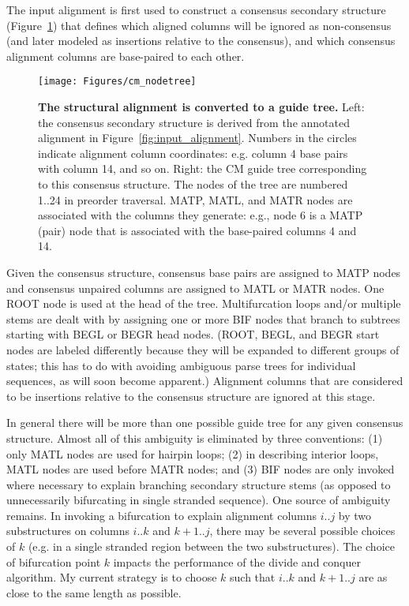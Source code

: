\documentclass[11pt]{article}
\begin{document}
The input alignment is first used to construct a consensus secondary
structure (Figure~\ref{fig:cm_nodetree}) that defines which aligned
columns will be ignored as non-consensus (and later modeled as
insertions relative to the consensus), and which consensus alignment
columns are base-paired to each other.

\begin{figure}[t]
\begin{center}
\texttt{[image: Figures/cm\_nodetree]}
\end{center}
\caption{\textbf{The structural alignment is converted to a guide
tree.} Left: the consensus secondary structure is derived from the
annotated alignment in Figure~\ref{fig:input_alignment}. Numbers in
the circles indicate alignment column coordinates: e.g.  column 4 base
pairs with column 14, and so on. Right: the CM guide tree
corresponding to this consensus structure. The nodes of the tree are
numbered 1..24 in preorder traversal. MATP, MATL, and MATR nodes are
associated with the columns they generate: e.g., node 6 is a MATP
(pair) node that is associated with the base-paired columns 4 and 14.}
\label{fig:cm_nodetree}
\end{figure}

Given the consensus structure, consensus base pairs are assigned to
MATP nodes and consensus unpaired columns are assigned to MATL or MATR
nodes. One ROOT node is used at the head of the tree.  Multifurcation
loops and/or multiple stems are dealt with by assigning one or more
BIF nodes that branch to subtrees starting with BEGL or BEGR head
nodes. (ROOT, BEGL, and BEGR start nodes are labeled differently
because they will be expanded to different groups of states; this has
to do with avoiding ambiguous parse trees for individual sequences, as
will soon become apparent.) Alignment columns that are considered to
be insertions relative to the consensus structure are ignored at this
stage.

In general there will be more than one possible guide tree for any
given consensus structure. Almost all of this ambiguity is eliminated
by three conventions: (1) only MATL nodes are used for hairpin loops;
(2) in describing interior loops, MATL nodes are used before MATR
nodes; and (3) BIF nodes are only invoked where necessary to explain
branching secondary structure stems (as opposed to unnecessarily
bifurcating in single stranded sequence). One source of ambiguity
remains. In invoking a bifurcation to explain alignment columns $i..j$
by two substructures on columns $i..k$ and $k+1..j$, there may be
several possible choices of $k$ (e.g. in a single stranded region
between the two substructures). The choice of bifurcation point $k$
impacts the performance of the divide and conquer algorithm. My
current strategy is to choose $k$ such that $i..k$ and $k+1..j$ are as
close to the same length as possible.
\end{document}
